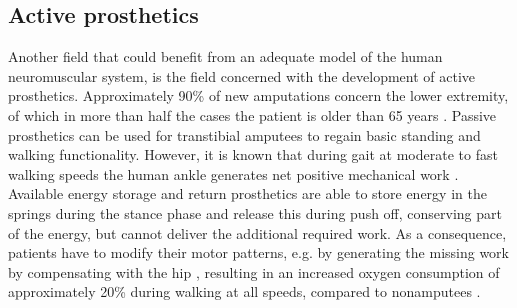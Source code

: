 

\subsection*{Active prosthetics}
Another field that could benefit from an adequate model of the human neuromuscular system, is the field concerned with the development of active prosthetics. Approximately 90\% of new amputations concern the lower extremity, of which in more than half the cases the patient is older than 65 years \cite{windrich_active_2016}. Passive prosthetics can be used for transtibial amputees to regain basic standing and walking functionality. However, it is known that during gait at moderate to fast walking speeds the human ankle generates net positive mechanical work \cite{gates_characterizing_2004}. Available energy storage and return prosthetics are able to store energy in the springs during the stance phase and release this during push off, conserving part of the energy, but cannot deliver the additional required work. As a consequence, patients have to modify their motor patterns, e.g. by generating the missing work by compensating with the hip \cite{winter_biomechanics_1988}, resulting in an increased oxygen consumption of approximately 20\% during walking at all speeds, compared to nonamputees \cite{molen_energy/speed_1973}. 

